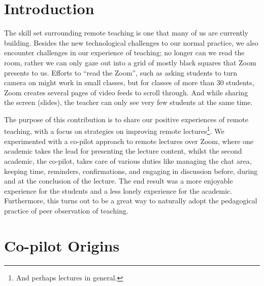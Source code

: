 \documentclass[sigconf]{acmart}
\begin{document}
\keywords{}

\maketitle

\section{Introduction}

The skill set surrounding remote teaching is one that many of us are currently 
building. Besides the new technological challenges to our normal practice, we 
also encounter challenges in our experience of teaching; no longer can we read 
the room, rather we can only gaze out into a grid of mostly black squares that 
Zoom presents to us.
Efforts to \enquote{read the Zoom}, such as asking students to turn camera on 
might work in small classes, but for classes of more than 30 students, Zoom 
creates several pages of video feeds to scroll through.
And while sharing the screen (\eg slides), the teacher can only see very few 
students at the same time.

The purpose of this contribution is to share our positive experiences of remote 
teaching, with a focus on strategies on improving remote lectures\footnote{%
  And perhaps lectures in general.
}.
We experimented with a co-pilot approach to remote lectures over Zoom, where 
one academic takes the lead for presenting the lecture content, whilst the 
second academic, the co-pilot, takes care of various duties like managing the 
chat area, keeping time, reminders, confirmations, and engaging in discussion 
before, during and at the conclusion of the lecture.
The end result was a more enjoyable experience for the students and a less 
lonely experience for the academic.
Furthermore, this turns out to be a great way to naturally adopt the 
pedagogical practice of peer observation of teaching.


\section{Co-pilot Origins}
\end{document}
